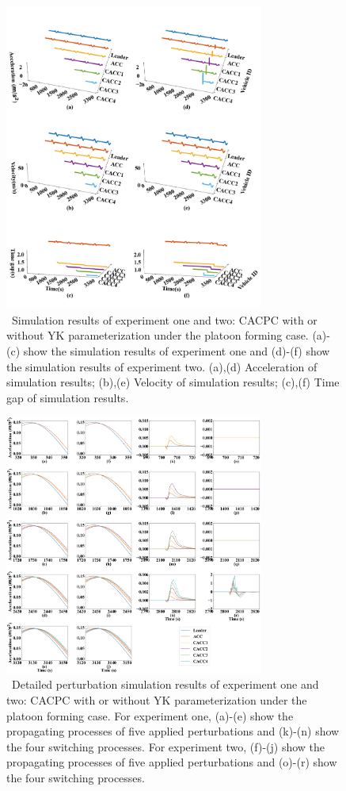 \documentclass[journal]{IEEEtran}
\begin{document}
\begin{figure}
  \centering
  \includegraphics[width=8.5cm]{figs/c_form.png}
  \caption{~Simulation results of experiment one and two: CACPC with or without YK parameterization under the platoon forming case. (a)-(c) show the simulation results of experiment one and (d)-(f) show the simulation results of experiment two. (a),(d) Acceleration of simulation results; (b),(e) Velocity of simulation results; (c),(f) Time gap of simulation results.}
  \label{new1}
\end{figure}

\begin{figure}
  \centering
  \includegraphics[width=8.5cm]{figs/form_detail.png}
  \caption{~Detailed perturbation simulation results of experiment one and two: CACPC with or without YK parameterization under the platoon forming case. For experiment one, (a)-(e) show the propagating processes of five applied perturbations and (k)-(n) show the four switching processes. For experiment two, (f)-(j) show the propagating processes of five applied perturbations and (o)-(r) show the four switching processes.}
  \label{new2}
\end{figure}
\end{document}
